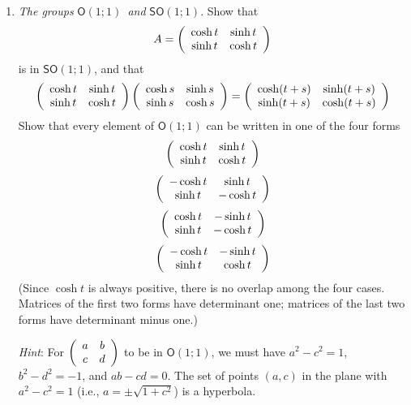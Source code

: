 \documentclass[12pt]{amsbook}
\theoremstyle{plain}
\numberwithin{equation}{chapter}
\numberwithin{theorem}{chapter}
\begin{document}
\begin{enumerate}
\item \label{so11}\textit{The groups }$\mathsf{O}(1;1)$\textit{\ and
}$\mathsf{SO}(1;1)$. Show that
\[
A=\left(
\begin{array}
[c]{cc}%
\cosh t & \sinh t\\
\sinh t & \cosh t
\end{array}
\right)
\]
is in $\mathsf{SO}(1;1)$, and that
\[
\left(
\begin{array}
[c]{cc}%
\cosh t & \sinh t\\
\sinh t & \cosh t
\end{array}
\right)  \left(
\begin{array}
[c]{cc}%
\cosh s & \sinh s\\
\sinh s & \cosh s
\end{array}
\right)  =\left(
\begin{array}
[c]{cc}%
\cosh(t+s) & \sinh(t+s)\\
\sinh(t+s) & \cosh(t+s)
\end{array}
\right)
\]
Show that every element of $\mathsf{O}(1;1)$ can be written in one of the four
forms
\[
\left(
\begin{array}
[c]{cc}%
\cosh t & \sinh t\\
\sinh t & \cosh t
\end{array}
\right)
\]%
\[
\left(
\begin{array}
[c]{cc}%
-\cosh t & \sinh t\\
\sinh t & -\cosh t
\end{array}
\right)
\]%
\[
\left(
\begin{array}
[c]{cc}%
\cosh t & -\sinh t\\
\sinh t & -\cosh t
\end{array}
\right)
\]%
\[
\left(
\begin{array}
[c]{cc}%
-\cosh t & -\sinh t\\
\sinh t & \cosh t
\end{array}
\right)
\]
(Since $\cosh t$ is always positive, there is no overlap among the four cases.
Matrices of the first two forms have determinant one; matrices of the last two
forms have determinant minus one.)

\textit{Hint}: For $\left(
\begin{array}
[c]{cc}%
a & b\\
c & d
\end{array}
\right)  $ to be in $\mathsf{O}(1;1)$, we must have $a^{2}-c^{2}=1$,
$b^{2}-d^{2}=-1$, and $ab-cd=0$. The set of points $\left(  a,c\right)  $ in
the plane with $a^{2}-c^{2}=1$ (i.e., $a=\pm\sqrt{1+c^{2}}$\thinspace) is a hyperbola.


\end{enumerate}
\end{document}
